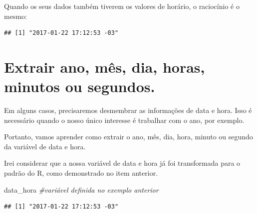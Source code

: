 \documentclass[
]{book}
\newenvironment{Shaded}{\begin{snugshade}}{\end{snugshade}}
\newcommand{\CommentTok}[1]{\textcolor[rgb]{0.56,0.35,0.01}{\textit{#1}}}
\newcommand{\KeywordTok}[1]{\textcolor[rgb]{0.13,0.29,0.53}{\textbf{#1}}}
\newcommand{\NormalTok}[1]{#1}
\newcommand{\StringTok}[1]{\textcolor[rgb]{0.31,0.60,0.02}{#1}}
\begin{document}
Quando os seus dados também tiverem os valores de horário, o raciocínio
é o mesmo:

\begin{Shaded}
\end{Shaded}

\begin{verbatim}
## [1] "2017-01-22 17:12:53 -03"
\end{verbatim}

\hypertarget{extrair-ano-muxeas-dia-horas-minutos-ou-segundos.}{%
\section{Extrair ano, mês, dia, horas, minutos ou
segundos.}\label{extrair-ano-muxeas-dia-horas-minutos-ou-segundos.}}

Em alguns casos, precisaremos desmembrar as informações de data e hora.
Isso é necessário quando o nosso único interesse é trabalhar com o ano,
por exemplo.

Portanto, vamos aprender como extrair o ano, mês, dia, hora, minuto ou
segundo da variável de data e hora.

Irei considerar que a nossa variável de data e hora já foi transformada
para o padrão do R, como demonstrado no item anterior.

\begin{Shaded}
\begin{Highlighting}[]
\NormalTok{data_hora }\CommentTok{#variável definida no exemplo anterior}
\end{Highlighting}
\end{Shaded}

\begin{verbatim}
## [1] "2017-01-22 17:12:53 -03"
\end{verbatim}

\begin{Shaded}
\end{Shaded}
\end{document}
